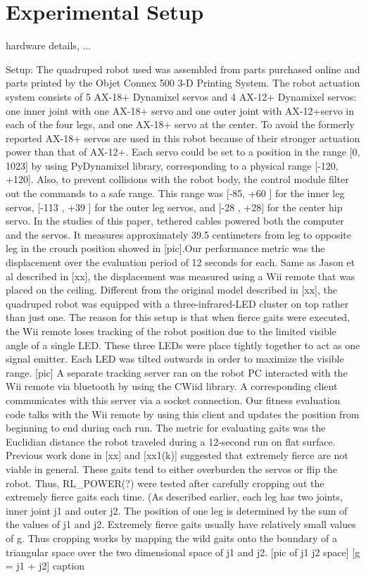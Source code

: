 \section{Experimental Setup}

hardware details, ...

Setup: The quadruped robot used was assembled from parts purchased online and parts printed by the Objet Connex 500 3-D Printing System. The robot actuation system consists of 5 AX-18+ Dynamixel servos and 4 AX-12+ Dynamixel servos: one inner joint with one AX-18+ servo and one outer joint with AX-12+servo in each of the four legs, and one AX-18+ servo at the center. To avoid the formerly reported AX-18+ servos are used in this robot because of their stronger actuation power than that of AX-12+. Each servo could be set to a position in the range [0, 1023] by using PyDynamixel library, corresponding to a physical range [-120, +120]. Also, to prevent collisions with the robot body, the control module filter out the commands to a safe range. This range was [-85, +60 ] for the inner leg servos, [-113 , +39 ] for the outer leg servos, and [-28 , +28] for the center hip servo. In the studies of this paper, tethered cables powered both the computer and the servos. It measures approximately 39.5 centimeters from leg to opposite leg in the crouch position showed in [pic].Our performance metric was the displacement over the evaluation period of 12 seconds for each. Same as Jason et al described in [xx], the displacement was measured using a Wii remote that was placed on the ceiling. Different from the original model described in [xx], the quadruped robot was equipped with a three-infrared-LED cluster on top rather than just one. The reason for this setup is that when fierce gaits were executed, the Wii remote loses tracking of the robot position due to the limited visible angle of a single LED.  These three LEDs were place tightly together to act as one signal emitter. Each LED was tilted outwards in order to maximize the visible range. [pic] A separate tracking server ran on the robot PC interacted with the Wii remote via bluetooth by using the CWiid library.  A corresponding client communicates with this server via a socket connection. Our fitness evaluation code talks with the Wii remote by using this client and updates the position from beginning to end during each run. The metric for evaluating gaits was the Euclidian distance the robot traveled during a 12-second run on flat surface. Previous work done in [xx] and [xx1(k)] suggested that extremely fierce are not viable in general. These gaits tend to either overburden the servos or flip the robot. Thus, RL\_POWER(?) were tested after carefully cropping out the extremely fierce gaits each time. (As described earlier, each leg has two joints, inner joint j1 and outer j2. The position of one leg is determined by the sum of the values of j1 and j2. Extremely fierce gaits usually have relatively small values of g. Thus cropping works by mapping the wild gaits onto the boundary of a triangular space over the two dimensional space of j1 and j2. [pic of j1 j2 space] [g = j1 + j2] caption
